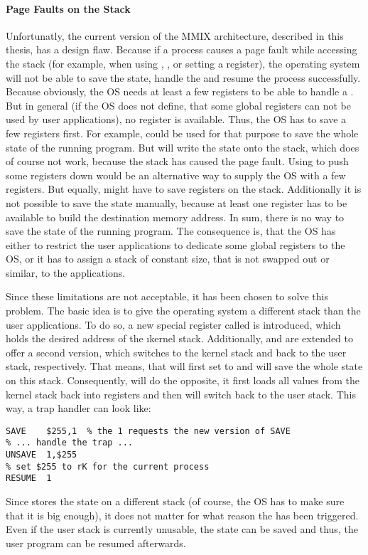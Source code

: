 \paragraph{Page Faults on the Stack}

Unfortunatly, the current version of the MMIX architecture, described in this thesis, has a design flaw. Because if a process causes a page fault while accessing the stack (for example, when using , ,  or setting a register), the operating system will not be able to save the state, handle the  and resume the process successfully. Because obviously, the OS needs at least a few registers to be able to handle a . But in general (\ie if the OS does not define, that some global registers can not be used by user applications), no register is available. Thus, the OS has to save a few registers first. For example,  could be used for that purpose to save the whole state of the running program. But  will write the state onto the stack, which does of course not work, because the stack has caused the page fault. Using  to push some registers down would be an alternative way to supply the OS with a few registers. But equally,  might have to save registers on the stack. Additionally it is not possible to save the state manually, because at least one register has to be available to build the destination memory address. In sum, there is no way to save the state of the running program. The consequence is, that the OS has either to restrict the user applications to dedicate some global registers to the OS, or it has to assign a stack of constant size, that is not swapped out or similar, to the applications.

Since these limitations are not acceptable, it has been chosen to solve this problem. The basic idea is to give the operating system a different stack than the user applications. To do so, a new special register called  is introduced, which holds the desired address of the \i{kernel stack}. Additionally,  and  are extended to offer a second version, which switches to the kernel stack and back to the user stack, respectively. That means, that  will first set  to  and will save the whole state on this stack. Consequently,  will do the opposite, \ie it first loads all values from the kernel stack back into registers and then will switch back to the user stack. This way, a trap handler can look like:
\begin{lstlisting}[language=mmixal,caption={Trap handler, using the extended {\tt SAVE} and {\tt UNSAVE}}]
SAVE	$255,1	% the 1 requests the new version of SAVE
% ... handle the trap ...
UNSAVE	1,$255
% set $255 to rK for the current process
RESUME	1
\end{lstlisting}
Since  stores the state on a different stack (of course, the OS has to make sure that it is big enough), it does not matter for what reason the  has been triggered. Even if the user stack is currently unusable, the state can be saved and thus, the user program can be resumed afterwards.

